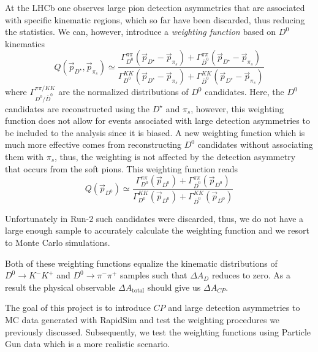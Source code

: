 \documentclass{article}
\begin{document}
        At the LHCb one observes large pion detection asymmetries that are associated with specific kinematic regions, which so far have been discarded, thus reducing the statistics.
        We can, however, introduce a \textit{weighting function} based on $D^0$ kinematics
        \begin{equation}
                \label{eq:weighting}
                Q(\vec{p}_{D^\star}, \vec{p}_{\pi_s}) \simeq \frac{\Gamma_{D^0}^{\pi\pi}(\vec{p}_{D^\star} - \vec{p}_{\pi_s}) + \Gamma_{\bar{D}^0}^{\pi\pi}(\vec{p}_{D^\star} - \vec{p}_{\pi_s})}{\Gamma_{D^0}^{KK}(\vec{p}_{D^\star} - \vec{p}_{\pi_s}) + \Gamma_{\bar{D}^0}^{KK}(\vec{p}_{D^\star} - \vec{p}_{\pi_s})}
        \end{equation}
        where $\Gamma_{D^{0}/\bar{D}^0}^{\pi\pi/KK}$ are the normalized distributions of $D^0$ candidates.
        Here, the $D^0$ candidates are reconstructed using the $D^\star$ and $\pi_s$, however, this weighting function does not allow for events associated with large detection asymmetries to be included to the analysis since it is biased.
        A new weighting function which is much more effective comes from reconstructing $D^0$ candidates without associating them with $\pi_s$, thus, the weighting is not affected by the detection asymmetry that occurs from the soft pions.
        This weighting function reads
        \begin{equation}
                \label{eq:weighting}
                Q(\vec{p}_{D^0}) \simeq \frac{\Gamma_{D^0}^{\pi\pi}(\vec{p}_{D^0}) + \Gamma_{\bar{D}^0}^{\pi\pi}(\vec{p}_{D^0})}{\Gamma_{D^0}^{KK}(\vec{p}_{D^0}) + \Gamma_{\bar{D}^0}^{KK}(\vec{p}_{D^0})}
        \end{equation}

        Unfortunately in Run-2 such candidates were discarded, thus, we do not have a large enough sample to accurately calculate the weighting function and we resort to Monte Carlo simulations.

        Both of these weighting functions equalize the kinematic distributions of $D^0\to K^-K^+$ and $D^0\to \pi^-\pi^+$ samples such that $\Delta A_D$ reduces to zero.
        As a result the physical observable $\Delta A_\text{total}$ should give us $\Delta A_{CP}$.

        The goal of this project is to introduce $CP$ and large detection asymmetries to MC data generated with RapidSim and test the weighting procedures we previously discussed.
        Subsequently, we test the weighting functions using Particle Gun data which is a more realistic scenario.
\end{document}
